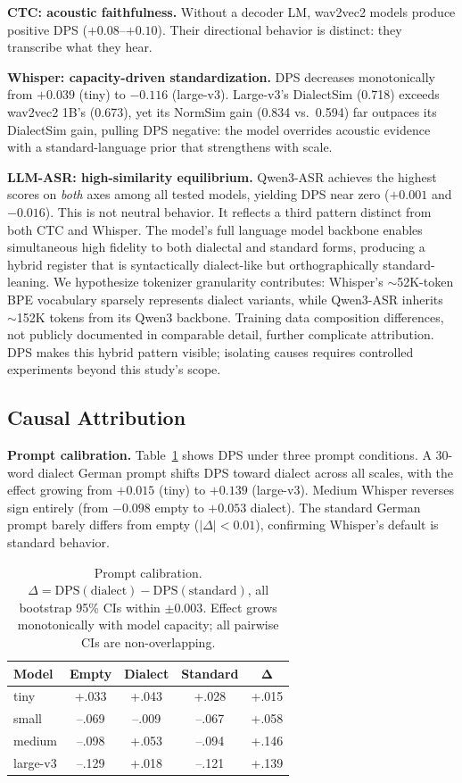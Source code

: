 \documentclass[11pt,a4paper]{article}
\begin{document}
\textbf{CTC: acoustic faithfulness.} Without a decoder LM, wav2vec2 models produce positive DPS ($+0.08$--$+0.10$). Their directional behavior is distinct: they transcribe what they hear.

\textbf{Whisper: capacity-driven standardization.} DPS decreases monotonically from $+0.039$ (tiny) to $-0.116$ (large-v3). Large-v3's DialectSim (0.718) exceeds wav2vec2 1B's (0.673), yet its NormSim gain (0.834 vs.\ 0.594) far outpaces its DialectSim gain, pulling DPS negative: the model overrides acoustic evidence with a standard-language prior that strengthens with scale.

\textbf{LLM-ASR: high-similarity equilibrium.} Qwen3-ASR achieves the highest scores on \textit{both} axes among all tested models, yielding DPS near zero ($+0.001$ and $-0.016$). This is not neutral behavior. It reflects a third pattern distinct from both CTC and Whisper. The model's full language model backbone enables simultaneous high fidelity to both dialectal and standard forms, producing a hybrid register that is syntactically dialect-like but orthographically standard-leaning. We hypothesize tokenizer granularity contributes: Whisper's $\sim$52K-token BPE vocabulary sparsely represents dialect variants, while Qwen3-ASR inherits $\sim$152K tokens from its Qwen3 backbone. Training data composition differences, not publicly documented in comparable detail, further complicate attribution. DPS makes this hybrid pattern visible; isolating causes requires controlled experiments beyond this study's scope.

\subsection{Causal Attribution}

\textbf{Prompt calibration.} Table~\ref{tab:prompt} shows DPS under three prompt conditions. A 30-word dialect German prompt shifts DPS toward dialect across all scales, with the effect growing from $+0.015$ (tiny) to $+0.139$ (large-v3). Medium Whisper reverses sign entirely (from $-0.098$ empty to $+0.053$ dialect). The standard German prompt barely differs from empty ($|\Delta| < 0.01$), confirming Whisper's default is standard behavior.

\begin{table}[t]
\centering\small
\begin{tabular}{lccc|c}
\toprule
\textbf{Model} & \textbf{Empty} & \textbf{Dialect} & \textbf{Standard} & $\bm{\Delta}$ \\
\midrule
tiny   & +.033 & +.043 & +.028 & +.015 \\
small  & --.069 & --.009 & --.067 & +.058 \\
medium & --.098 & +.053 & --.094 & +.146 \\
large-v3 & --.129 & +.018 & --.121 & +.139 \\
\bottomrule
\end{tabular}
\caption{Prompt calibration. $\Delta = \text{DPS}(\text{dialect}) - \text{DPS}(\text{standard})$, all bootstrap 95\% CIs within $\pm 0.003$. Effect grows monotonically with model capacity; all pairwise CIs are non-overlapping.}
\label{tab:prompt}
\end{table}
\end{document}
